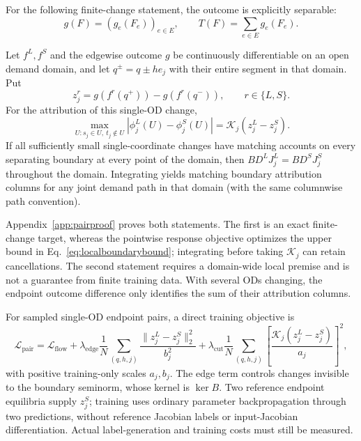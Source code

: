 For the following finite-change statement, the outcome is explicitly separable:
\[
g(F)=(g_e(F_e))_{e\in E},\qquad T(F)=\sum_{e\in E}g_e(F_e).
\]
\begin{proposition}\label{prop:pairboundary}
Let $f^L,f^S$ and the edgewise outcome $g$ be continuously differentiable
on an open demand domain, and let $q^\pm=q\pm h e_j$ with their entire
segment in that domain. Put
\[
z_j^r=g(f^r(q^+))-g(f^r(q^-)),\qquad r\in\{L,S\}.
\]
For the attribution of this single-OD change,
\begin{equation}
\max_{U:s_j\in U,\ t_j\notin U}|\phi_j^L(U)-\phi_j^S(U)|
=\mathcal K_j(z_j^L-z_j^S).\label{eq:pairboundaryexact}
\end{equation}
If all sufficiently small single-coordinate changes have matching
accounts on every separating boundary at every point of the domain,
then $BD^LJ_j^L=BD^SJ_j^S$ throughout the domain. Integrating yields
matching boundary attribution columns for any joint demand path in that
domain (with the same columnwise path convention).
\end{proposition}
Appendix~\ref{app:pairproof} proves both statements. The first is an
exact finite-change target, whereas the pointwise response objective
optimizes the upper bound in Eq.~\eqref{eq:localboundarybound}; integrating
before taking $\mathcal K_j$ can retain cancellations. The second statement
requires a domain-wide local premise and is not a guarantee from finite
training data. With several ODs changing, the endpoint outcome difference
only identifies the sum of their attribution columns.

For sampled single-OD endpoint pairs, a direct training objective is
\begin{equation}
\mathcal L_{\mathrm{pair}}=\mathcal L_{\mathrm{flow}}
+\lambda_{\mathrm{edge}}\frac1N\sum_{(q,h,j)}
\frac{\|z_j^L-z_j^S\|_2^2}{b_j^2}
+\lambda_{\mathrm{cut}}\frac1N\sum_{(q,h,j)}
\left[\frac{\mathcal K_j(z_j^L-z_j^S)}{a_j}\right]^2,
\label{eq:pairobjective}
\end{equation}
with positive training-only scales $a_j,b_j$. The edge term controls
changes invisible to the boundary seminorm, whose kernel is $\ker B$.
Two reference endpoint equilibria supply $z_j^S$; training uses ordinary
parameter backpropagation through two predictions, without reference
Jacobian labels or input-Jacobian differentiation. Actual label-generation
and training costs must still be measured.
